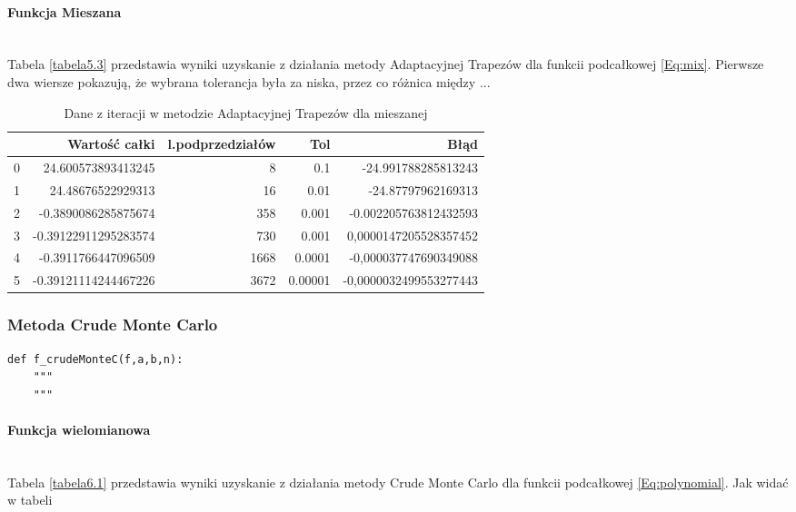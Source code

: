 \documentclass[12pt,twoside]{article}
\begin{document}
\paragraph{Funkcja Mieszana}\mbox{} \\

Tabela \eqref{tabela5.3} przedstawia wyniki uzyskanie z działania metody Adaptacyjnej Trapezów dla funkcii podcałkowej \eqref{Eq:mix}. Pierwsze dwa wiersze pokazują, że wybrana tolerancja była za niska, przez co różnica między ...

\begin{table}[H]
\centering 
\caption{Dane z iteracji w metodzie Adaptacyjnej Trapezów dla mieszanej}
\label{tabela5.3}
\begin{tabular}{lrrrr}
\toprule
{} &  Wartość całki &  l.podprzedziałów &  Tol &      Błąd \\
\midrule
0 &       24.600573893413245 &  8  &   0.1 & -24.991788285813243 \\
1 &       24.48676522929313 &  16 &   0.01 & -24.87797962169313 \\
2 &       -0.3890086285875674 &  358  &  0.001 & -0.002205763812432593 \\
3 &       -0.39122911295283574 &  730  &  0.001  & 0,0000147205528357452 \\
4 &       -0.3911766447096509 &  1668  &  0.0001  & -0,000037747690349088 \\
5 &       -0.39121114244467226 &  3672  &  0.00001  & -0,0000032499553277443 \\
\bottomrule
\end{tabular}
\end{table}

\subsubsection{Metoda Crude Monte Carlo}

\begin{lstlisting}[caption={Kod w języku python implementujący metodę trapezów}]
def f_crudeMonteC(f,a,b,n):
    """
    """
\end{lstlisting}
\label{Listing 11}

\paragraph{Funkcja wielomianowa}\mbox{} \\

Tabela \eqref{tabela6.1} przedstawia wyniki uzyskanie z działania metody Crude Monte Carlo dla funkcii podcałkowej \eqref{Eq:polynomial}.
Jak widać w tabeli 
\end{document}
